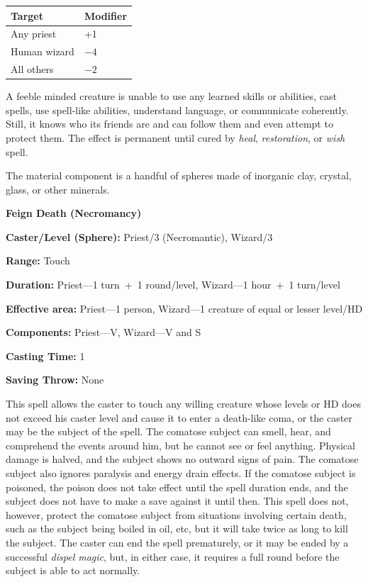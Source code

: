 \begin{multicols}{2}
\noindent
\begin{tabular}{|p{}|p{}|}
\hline
Target	& Modifier \\
\hline\hline
\rowcolor[gray]{.9}Any priest	& +1 \\
Human wizard	& $-4$ \\
\rowcolor[gray]{.9}All others	& $-2$ \\
\hline
\end{tabular}

A feeble minded creature is unable to use any learned skills or abilities, cast spells, use spell-like abilities, understand language, or communicate coherently.  Still, it knows who its friends are and can follow them and even attempt to protect them.  The effect is permanent until cured by \textit{heal}, \textit{restoration}, or \textit{wish} spell.

The material component is a handful of spheres made of inorganic clay, crystal, glass, or other minerals.

\vspace{1em}

\noindent
\begin{minipage}{\columnwidth}

\noindent \textbf{Feign Death (Necromancy)}

\noindent \textbf{Caster/Level (Sphere):} Priest/3 (Necromantic), Wizard/3

\noindent \textbf{Range:} Touch

\noindent \textbf{Duration:} Priest---1 turn~+~1 round/level, Wizard---1 hour~+~1 turn/level

\noindent \textbf{Effective area:} Priest---1 person, Wizard---1 creature of equal or lesser level/HD

\noindent \textbf{Components:} Priest---V, Wizard---V and S

\noindent \textbf{Casting Time:} 1

\noindent \textbf{Saving Throw:} None

\end{minipage}

This spell allows the caster to touch any willing creature whose levels or HD does not exceed his caster level and cause it to enter a death-like coma, or the caster may be the subject of the spell.  The comatose subject can smell, hear, and comprehend the events around him, but he cannot see or feel anything.  Physical damage is halved, and the subject shows no outward signs of pain.  The comatose subject also ignores paralysis and energy drain effects.  If the comatose subject is poisoned, the poison does not take effect until the spell duration ends, and the subject does not have to make a save against it until then.  This spell does not, however, protect the comatose subject from situations involving certain death, such as the subject being boiled in oil, etc, but it will take twice as long to kill the subject.  The caster can end the spell prematurely, or it may be ended by a successful \textit{dispel magic}, but, in either case, it requires a full round before the subject is able to act normally.


\end{multicols}
